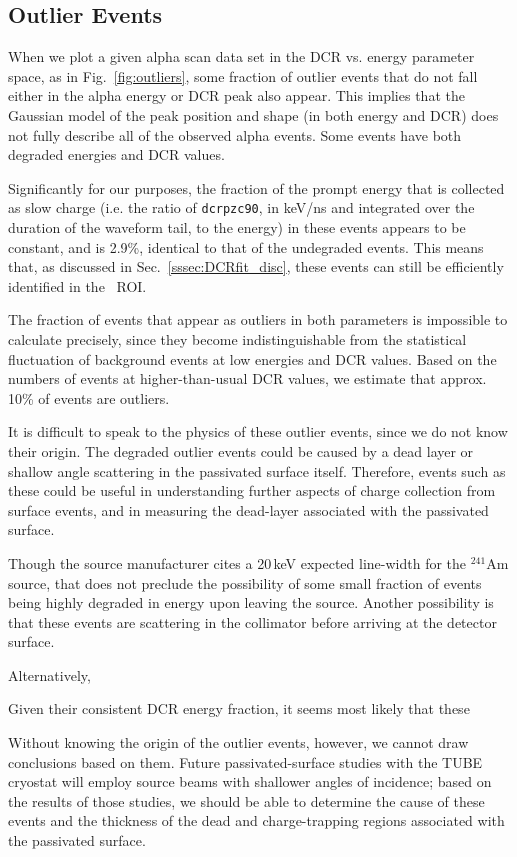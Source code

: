 \subsection{Outlier Events}\label{sssec:outliers}
When we plot a given alpha scan data set in the DCR vs. energy parameter space, as in Fig.~\ref{fig:outliers}, some fraction of outlier events that do not fall either in the alpha energy or DCR peak also appear. This implies that the Gaussian model of the peak position and shape (in both energy and DCR) does not fully describe all of the observed alpha events. Some events have both degraded energies and DCR values. 

Significantly for our purposes, the fraction of the prompt energy that is collected as slow charge (i.e. the ratio of {\tt dcrpzc90}, in keV/ns and integrated over the duration of the waveform tail, to the energy) in these events appears to be constant, and is 2.9\%, identical to that of the undegraded events. This means that, as discussed in Sec.~\ref{sssec:DCRfit_disc}, these events can still be efficiently identified in the \nonubb\ ROI.

The fraction of events that appear as outliers in both parameters is impossible to calculate precisely, since they become indistinguishable from the statistical fluctuation of background events at low energies and DCR values. Based on the numbers of events at higher-than-usual DCR values, we estimate that approx. 10\% of events are outliers. 

It is difficult to speak to the physics of these outlier events, since we do not know their origin. The degraded outlier events could be caused by a dead layer or shallow angle scattering in the passivated surface itself. Therefore, events such as these could be useful in understanding further aspects of charge collection from surface events, and in measuring the dead-layer associated with the passivated surface. 

Though the source manufacturer cites a 20\,keV expected line-width for the $^{241}$Am source, that does not preclude the possibility of some small fraction of events being highly degraded in energy upon leaving the source. Another possibility is that these events are scattering in the collimator before arriving at the detector surface.

Alternatively, 

Given their consistent DCR energy fraction, it seems most likely that these 

Without knowing the origin of the outlier events, however, we cannot draw conclusions based on them. Future passivated-surface studies with the TUBE cryostat will employ source beams with shallower angles of incidence; based on the results of those studies, we should be able to determine the cause of these events and the thickness of the dead and charge-trapping regions associated with the passivated surface. 

